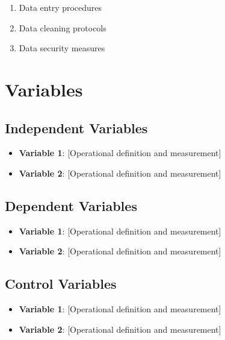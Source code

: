 \documentclass[
  12pt,
  letterpaper,
  12pt,
  letterpaper,
  oneside]{report}
\providecommand{\tightlist}{%
  \setlength{\itemsep}{0pt}\setlength{\parskip}{0pt}}
\begin{document}
\begin{enumerate}
\def\labelenumi{\arabic{enumi}.}
\tightlist
\item
  Data entry procedures
\item
  Data cleaning protocols
\item
  Data security measures
\end{enumerate}

\section{Variables}\label{variables}

\subsection{Independent Variables}\label{independent-variables}

\begin{itemize}
\tightlist
\item
  \textbf{Variable 1}: {[}Operational definition and measurement{]}
\item
  \textbf{Variable 2}: {[}Operational definition and measurement{]}
\end{itemize}

\subsection{Dependent Variables}\label{dependent-variables}

\begin{itemize}
\tightlist
\item
  \textbf{Variable 1}: {[}Operational definition and measurement{]}
\item
  \textbf{Variable 2}: {[}Operational definition and measurement{]}
\end{itemize}

\subsection{Control Variables}\label{control-variables}

\begin{itemize}
\tightlist
\item
  \textbf{Variable 1}: {[}Operational definition and measurement{]}
\item
  \textbf{Variable 2}: {[}Operational definition and measurement{]}
\end{itemize}
\end{document}

